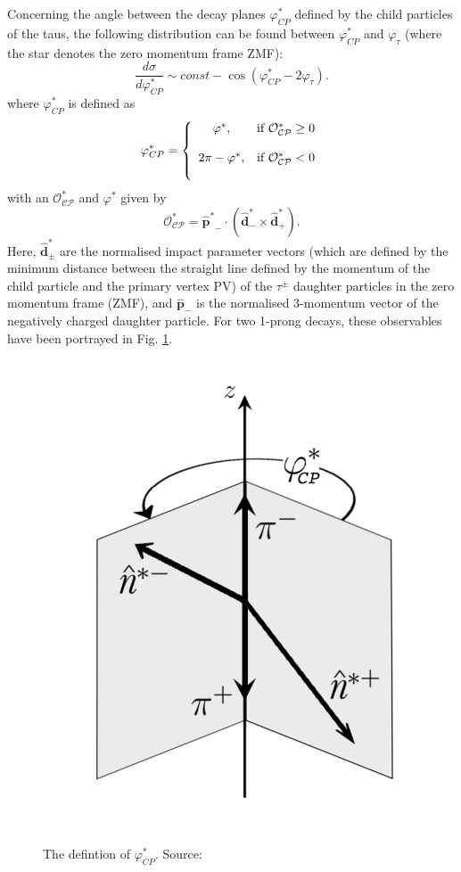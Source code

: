 Concerning the angle between the decay planes $\varphi_{CP}^*$ defined by the child particles of the taus, the following distribution can be found between $\varphi_{CP}^*$ and $\varphi_\tau$ (where the star denotes the zero momentum frame ZMF):
\begin{equation}
	\label{eq:CP_Star_Distribution}
	\frac{d\sigma}{d\varphi_{CP}^*} \sim const - \cos(\varphi_{CP}^*-2\varphi_\tau).
\end{equation}
where $\varphi_{CP}^*$ is defined as
\begin{equation}
	\varphi_{CP}^* = \left\lbrace\begin{array}{cc}
	\varphi^*, \bigskip &\text{if } \mathcal{O_{CP}^*}\geq 0\\
	2\pi-\varphi^*, \bigskip &\text{if } \mathcal{O_{CP}^*}< 0
	\end{array}\right.
\end{equation}
with an $\mathcal{O_{CP}^*}$ and $\varphi^*$ given by
\begin{equation}
	\mathcal{O_{CP}^*} = \boldsymbol{\hat{p}^*}_- \cdot (\boldsymbol{\hat{d}}_-^*\times\boldsymbol{\hat{d}}_+^*).
\end{equation}
Here, $\boldsymbol{\hat{d}_\pm^*}$ are the normalised impact parameter vectors (which are defined by the minimum distance between the straight line defined by the momentum of the child particle and the primary vertex PV) of the $\tau^\pm$ daughter particles in the zero momentum frame (ZMF), and $\boldsymbol{\hat{p}}_-$ is the normalised 3-momentum vector of the negatively charged daughter particle. For two 1-prong decays, these observables have been portrayed in Fig. \ref{fig:decayplanesphistar}.
\begin{figure}[h]
	\centering
	\includegraphics[width=0.3\linewidth]{Figures/decay_planes_phi_Star}
	\caption{The defintion of $\varphi_{CP}^*$. Source: \parencite{Berge_CP_Prospects}}
	\label{fig:decayplanesphistar}
\end{figure}
